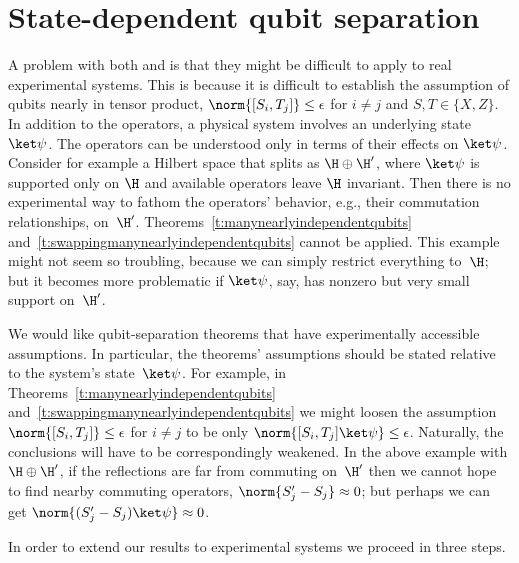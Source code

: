 \documentclass[11pt]{article}
\begin{document}
\fi


\section{State-dependent qubit separation} \label{s:statedependent}

A problem with both  and  is that they might be difficult to apply to real experimental systems.  This is because it is difficult to establish the assumption of qubits nearly in tensor product, $\norm{[S_i, T_j]} \leq \epsilon$ for $i \neq j$ and $S, T\in\{X,Z\}$.  In addition to the operators, a physical system involves an underlying state~$\ket \psi$.  The operators can be understood only in terms of their effects on $\ket \psi$.  Consider for example a Hilbert space that splits as $\H \oplus \H'$, where $\ket \psi$ is supported only on $\H$ and available operators leave $\H$ invariant.  Then there is no experimental way to fathom the operators' behavior, e.g., their commutation relationships, on~$\H'$.  Theorems~\ref{t:manynearlyindependentqubits} and~\ref{t:swappingmanynearlyindependentqubits} cannot be applied.  This example might not seem so troubling, because we can simply restrict everything to~$\H$; but it becomes more problematic if $\ket \psi$, say, has nonzero but very small support on~$\H'$.  

We would like qubit-separation theorems that have experimentally accessible assumptions.  In particular, the theorems' assumptions should be stated relative to the system's state~$\ket \psi$.  For example, in Theorems~\ref{t:manynearlyindependentqubits} and~\ref{t:swappingmanynearlyindependentqubits} we might loosen the assumption $\norm{[S_i, T_j]} \leq \epsilon$ for $i \neq j$ to be only $\norm{[S_i, T_j] \ket \psi} \leq \epsilon$.  Naturally, the conclusions will have to be correspondingly weakened.  In the above example with $\H \oplus \H'$, if the reflections are far from commuting on~$\H'$ then we cannot hope to find nearby commuting operators, $\norm{S_j' - S_j} \approx 0$; but perhaps we can get $\norm{(S_j' - S_j) \ket \psi} \approx 0$.  

In order to extend our results to experimental systems we proceed in three steps.  
\end{document}
